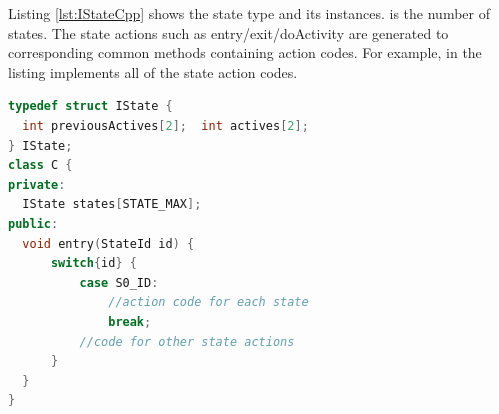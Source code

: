 Listing \ref{lst:IStateCpp} shows the state type and its instances. 
 is the number of states. 
The state actions such as entry/exit/doActivity are generated to corresponding common methods containing action codes.
For example,  in the listing implements all of the state action codes.


\begin{lstlisting}[caption=IState interface and function pointers in C++, label=lst:IStateCpp, language=C++,float]
typedef struct IState {
  int previousActives[2];  int actives[2];
} IState;
class C {
private:
  IState states[STATE_MAX];
public:
  void entry(StateId id) {
	  switch{id} {
		  case S0_ID:
			  //action code for each state
			  break;
		  //code for other state actions  
	  }
  }
}
\end{lstlisting}

